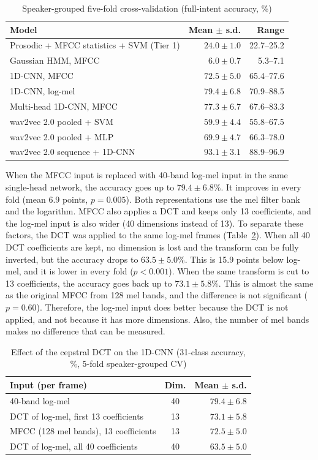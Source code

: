\documentclass[conference]{IEEEtran}
\begin{document}
\begin{table}[t]
\caption{Speaker-grouped five-fold cross-validation (full-intent accuracy, \%)}
\label{tab:cv}
\centering
\footnotesize
\begin{tabular}{@{}lrr@{}}
\toprule
Model & Mean $\pm$ s.d. & Range\\
\midrule
Prosodic + MFCC statistics + SVM (Tier 1) & $24.0 \pm 1.0$ & 22.7--25.2\\
\midrule
Gaussian HMM, MFCC & $6.0 \pm 0.7$ & 5.3--7.1\\
\midrule
1D-CNN, MFCC & $72.5 \pm 5.0$ & 65.4--77.6\\
1D-CNN, log-mel & $79.4 \pm 6.8$ & 70.9--88.5\\
Multi-head 1D-CNN, MFCC & $77.3 \pm 6.7$ & 67.6--83.3\\
\midrule
wav2vec 2.0 pooled + SVM & $59.9 \pm 4.4$ & 55.8--67.5\\
wav2vec 2.0 pooled + MLP & $69.9 \pm 4.7$ & 66.3--78.0\\
wav2vec 2.0 sequence + 1D-CNN & $\mathbf{93.1 \pm 3.1}$ & 88.9--96.9\\
\bottomrule
\end{tabular}
\end{table}

When the MFCC input is replaced with 40-band log-mel input in the same single-head network, the accuracy goes up to $79.4 \pm 6.8\%$. It improves in every fold (mean 6.9 points, $p = 0.005$). Both representations use the mel filter bank and the logarithm. MFCC also applies a DCT and keeps only 13 coefficients, and the log-mel input is also wider (40 dimensions instead of 13). To separate these factors, the DCT was applied to the same log-mel frames (Table~\ref{tab:dct}). When all 40 DCT coefficients are kept, no dimension is lost and the transform can be fully inverted, but the accuracy drops to $63.5 \pm 5.0\%$. This is 15.9 points below log-mel, and it is lower in every fold ($p < 0.001$). When the same transform is cut to 13 coefficients, the accuracy goes back up to $73.1 \pm 5.8\%$. This is almost the same as the original MFCC from 128 mel bands, and the difference is not significant ($p = 0.60$). Therefore, the log-mel input does better because the DCT is not applied, and not because it has more dimensions. Also, the number of mel bands makes no difference that can be measured.

\begin{table}[t]
\caption{Effect of the cepstral DCT on the 1D-CNN (31-class accuracy, \%, 5-fold speaker-grouped CV)}
\label{tab:dct}
\centering
\footnotesize
\begin{tabular}{@{}lcr@{}}
\toprule
Input (per frame) & Dim. & Mean $\pm$ s.d.\\
\midrule
40-band log-mel & 40 & $\mathbf{79.4 \pm 6.8}$\\
DCT of log-mel, first 13 coefficients & 13 & $73.1 \pm 5.8$\\
MFCC (128 mel bands), 13 coefficients & 13 & $72.5 \pm 5.0$\\
DCT of log-mel, all 40 coefficients & 40 & $63.5 \pm 5.0$\\
\bottomrule
\end{tabular}
\end{table}
\end{document}
